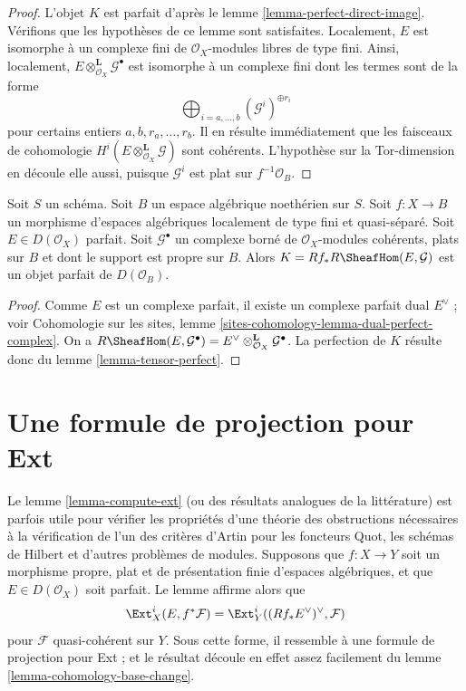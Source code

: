 \begin{proof}
L'objet $K$ est parfait d'apr\`es le lemme \ref{lemma-perfect-direct-image}.
V\'erifions que les hypoth\`eses de ce lemme sont satisfaites. Localement, $E$
est isomorphe \`a un complexe fini de $\mathcal{O}_X$-modules libres de type
fini. Ainsi, localement,
$E\otimes^\mathbf{L}_{\mathcal{O}_X}\mathcal{G}^\bullet$ est isomorphe \`a un
complexe fini dont les termes sont de la forme
$$
\bigoplus\nolimits_{i = a, \ldots, b} (\mathcal{G}^i)^{\oplus r_i}
$$
pour certains entiers $a,b,r_a,\ldots,r_b$. Il en r\'esulte imm\'ediatement que
les faisceaux de cohomologie
$H^i(E\otimes^\mathbf{L}_{\mathcal{O}_X}\mathcal{G})$ sont coh\'erents.
L'hypoth\`ese sur la Tor-dimension en d\'ecoule elle aussi, puisque
$\mathcal{G}^i$ est plat sur $f^{-1}\mathcal{O}_B$.
\end{proof}

\begin{lemma}
\label{lemma-ext-perfect}
Soit $S$ un sch\'ema. Soit $B$ un espace alg\'ebrique noeth\'erien sur $S$.
Soit $f:X\to B$ un morphisme d'espaces alg\'ebriques localement de type fini
et quasi-s\'epar\'e. Soit $E\in D(\mathcal{O}_X)$ parfait. Soit
$\mathcal{G}^\bullet$ un complexe born\'e de $\mathcal{O}_X$-modules coh\'erents,
plats sur $B$ et dont le support est propre sur $B$. Alors
$K=Rf_*R\SheafHom(E,\mathcal{G})$ est un objet parfait de
$D(\mathcal{O}_B)$.
\end{lemma}

\begin{proof}
Comme $E$ est un complexe parfait, il existe un complexe parfait dual
$E^\vee$ ; voir Cohomologie sur les sites, lemme
\ref{sites-cohomology-lemma-dual-perfect-complex}. On a
$R\SheafHom(E,\mathcal{G}^\bullet)=
E^\vee\otimes^\mathbf{L}_{\mathcal{O}_X}\mathcal{G}^\bullet$.
La perfection de $K$ r\'esulte donc du lemme \ref{lemma-tensor-perfect}.
\end{proof}

\section{Une formule de projection pour Ext}
\label{section-ext}

\noindent
Le lemme \ref{lemma-compute-ext} (ou des r\'esultats analogues de la
litt\'erature) est parfois utile pour v\'erifier les propri\'et\'es d'une th\'eorie
des obstructions n\'ecessaires \`a la v\'erification de l'un des crit\`eres d'Artin
pour les foncteurs Quot, les sch\'emas de Hilbert et d'autres probl\`emes de
modules. Supposons que $f:X\to Y$ soit un morphisme propre, plat et de
pr\'esentation finie d'espaces alg\'ebriques, et que
$E\in D(\mathcal{O}_X)$ soit parfait. Le lemme affirme alors que
$$
\Ext^i_X(E, f^*\mathcal{F}) =
\Ext^i_Y((Rf_*E^\vee)^\vee, \mathcal{F})
$$
pour $\mathcal{F}$ quasi-coh\'erent sur $Y$. Sous cette forme, il ressemble \`a
une formule de projection pour Ext ; et le r\'esultat d\'ecoule en effet assez
facilement du lemme \ref{lemma-cohomology-base-change}.

